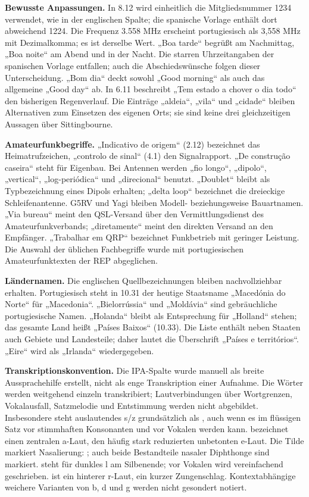 \documentclass[a4paper,landscape,10pt]{article}
\newcommand{\ipa}[1]{{\ipafont[#1]}}
\begin{document}
\medskip
\textbf{Bewusste Anpassungen.} In 8.12 wird einheitlich die Mitgliedsnummer 1234 verwendet, wie
in der englischen Spalte; die spanische Vorlage enthält dort abweichend 1224. Die Frequenz 3.558 MHz
erscheint portugiesisch als 3,558 MHz mit Dezimalkomma; es ist derselbe Wert.
„Boa tarde“ begrüßt am Nachmittag, „Boa noite“ am Abend und in der Nacht. Die starren Uhrzeitangaben
der spanischen Vorlage entfallen; auch die Abschiedswünsche folgen dieser Unterscheidung.
„Bom dia“ deckt sowohl „Good morning“ als auch das allgemeine „Good day“ ab.
In 6.11 beschreibt „Tem estado a chover o dia todo“ den bisherigen Regenverlauf.
Die Einträge „aldeia“, „vila“ und „cidade“ bleiben Alternativen zum Einsetzen des eigenen Orts;
sie sind keine drei gleichzeitigen Aussagen über Sittingbourne.

\medskip
\textbf{Amateurfunkbegriffe.} „Indicativo de origem“ (2.12) bezeichnet das Heimatrufzeichen,
„controlo de sinal“ (4.1) den Signalrapport. „De construção caseira“ steht für Eigenbau.
Bei Antennen werden „fio longo“, „dipolo“, „vertical“, „log-periódica“ und „direcional“ benutzt.
„Doublet“ bleibt als Typbezeichnung eines Dipols erhalten; „delta loop“ bezeichnet die dreieckige
Schleifenantenne. G5RV und Yagi bleiben Modell- beziehungsweise Bauartnamen.
„Via bureau“ meint den QSL-Versand über den Vermittlungsdienst des Amateurfunkverbands;
„diretamente“ meint den direkten Versand an den Empfänger. „Trabalhar em QRP“ bezeichnet
Funkbetrieb mit geringer Leistung. Die Auswahl der üblichen Fachbegriffe wurde mit portugiesischen
Amateurfunktexten der REP abgeglichen.

\medskip
\textbf{Ländernamen.} Die englischen Quellbezeichnungen bleiben nachvollziehbar erhalten.
Portugiesisch steht in 10.31 der heutige Staatsname „Macedónia do Norte“ für „Macedonia“.
„Bielorrússia“ und „Moldávia“ sind gebräuchliche portugiesische Namen.
„Holanda“ bleibt als Entsprechung für „Holland“ stehen; das gesamte Land heißt „Países Baixos“ (10.33).
Die Liste enthält neben Staaten auch Gebiete und Landesteile; daher lautet die Überschrift
„Países e territórios“. „Eire“ wird als „Irlanda“ wiedergegeben.

\medskip
\textbf{Transkriptionskonvention.} Die IPA-Spalte wurde manuell als breite Aussprachehilfe erstellt,
nicht als enge Transkription einer Aufnahme. Die Wörter werden weitgehend einzeln transkribiert;
Lautverbindungen über Wortgrenzen, Vokalausfall, Satzmelodie und Entstimmung werden nicht abgebildet.
Insbesondere steht auslautendes s/z grundsätzlich als \ipa{ʃ}, auch wenn es im flüssigen Satz
vor stimmhaften Konsonanten \ipa{ʒ} und vor Vokalen \ipa{z} werden kann.
\ipa{ɐ} bezeichnet einen zentralen a-Laut, \ipa{ɨ} den häufig stark reduzierten unbetonten e-Laut.
Die Tilde markiert Nasalierung: \ipa{ɐ̃, ẽ, ĩ, õ, ũ}; auch beide Bestandteile nasaler Diphthonge
sind markiert. \ipa{ɫ} steht für dunkles l am Silbenende; vor Vokalen wird vereinfachend \ipa{l} geschrieben.
\ipa{ʁ} ist ein hinterer r-Laut, \ipa{ɾ} ein kurzer Zungenschlag.
Kontextabhängige weichere Varianten von b, d und g werden nicht gesondert notiert.
\end{document}

